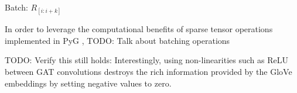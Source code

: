 Batch: \(R_{[i:i+k]}\)

In order to leverage the computational benefits of sparse tensor operations implemented in PyG \cite{fey2019fast},
{\color{red} TODO: Talk about batching operations}


{\color{red} TODO: Verify this still holds: Interestingly, using non-linearities such as ReLU between GAT convolutions destroys the rich information provided by the GloVe embeddings by setting negative values to zero.}



